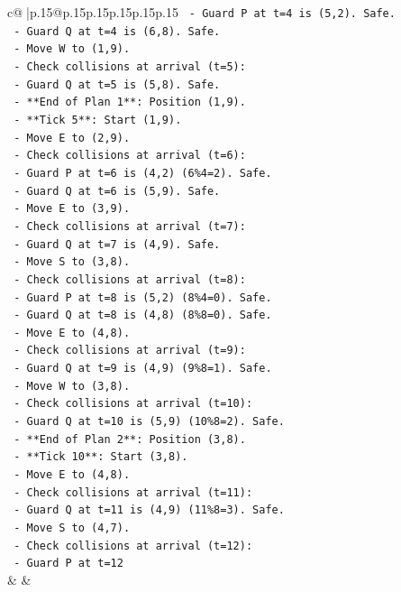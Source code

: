 \documentclass{article}
\begin{document}
{\begin{supertabular}{c@{$\;$}|p{.15\linewidth}@{}p{.15\linewidth}p{.15\linewidth}p{.15\linewidth}p{.15\linewidth}p{.15\linewidth}}
{{{\texttt{       {-} Guard P at t=4 is (5,2). Safe.} \\
\texttt{       {-} Guard Q at t=4 is (6,8). Safe.} \\
\texttt{     {-} Move W to (1,9).} \\
\texttt{     {-} Check collisions at arrival (t=5):} \\
\texttt{       {-} Guard Q at t=5 is (5,8). Safe.} \\
\texttt{     {-} **End of Plan 1**: Position (1,9).} \\
\texttt{   {-} **Tick 5**: Start (1,9).} \\
\texttt{     {-} Move E to (2,9).} \\
\texttt{     {-} Check collisions at arrival (t=6):} \\
\texttt{       {-} Guard P at t=6 is (4,2) (6\%4=2). Safe.} \\
\texttt{       {-} Guard Q at t=6 is (5,9). Safe.} \\
\texttt{     {-} Move E to (3,9).} \\
\texttt{     {-} Check collisions at arrival (t=7):} \\
\texttt{       {-} Guard Q at t=7 is (4,9). Safe.} \\
\texttt{     {-} Move S to (3,8).} \\
\texttt{     {-} Check collisions at arrival (t=8):} \\
\texttt{       {-} Guard P at t=8 is (5,2) (8\%4=0). Safe.} \\
\texttt{       {-} Guard Q at t=8 is (4,8) (8\%8=0). Safe.} \\
\texttt{     {-} Move E to (4,8).} \\
\texttt{     {-} Check collisions at arrival (t=9):} \\
\texttt{       {-} Guard Q at t=9 is (4,9) (9\%8=1). Safe.} \\
\texttt{     {-} Move W to (3,8).} \\
\texttt{     {-} Check collisions at arrival (t=10):} \\
\texttt{       {-} Guard Q at t=10 is (5,9) (10\%8=2). Safe.} \\
\texttt{     {-} **End of Plan 2**: Position (3,8).} \\
\texttt{   {-} **Tick 10**: Start (3,8).} \\
\texttt{     {-} Move E to (4,8).} \\
\texttt{     {-} Check collisions at arrival (t=11):} \\
\texttt{       {-} Guard Q at t=11 is (4,9) (11\%8=3). Safe.} \\
\texttt{     {-} Move S to (4,7).} \\
\texttt{     {-} Check collisions at arrival (t=12):} \\
\texttt{       {-} Guard P at t=12} \\
            }
        }
    }
    & & \\ \\


\end{supertabular}}
\end{document}
